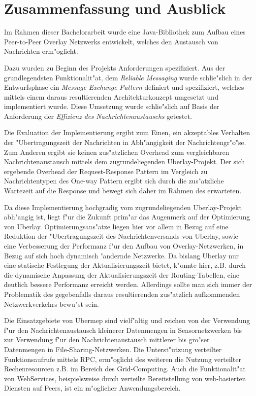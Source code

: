 \chapter{Zusammenfassung und Ausblick}
\label{cha:zusammenfassung}

Im Rahmen dieser Bachelorarbeit wurde eine Java-Bibliothek zum Aufbau eines Peer-to-Peer Overlay Netzwerks entwickelt, welches den Austausch von Nachrichten erm"oglicht.

Dazu wurden zu Beginn des Projekts Anforderungen spezifiziert. Aus der grundlegendsten Funktionalit"at, dem \emph{Reliable Messaging} wurde schlie"slich in der Entwurfsphase ein \emph{Message Exchange Pattern} definiert und spezifiziert, welches mittels einem daraus resultierenden Architekturkonzept umgesetzt und implementiert wurde. Diese Umsetzung wurde schlie"slich auf Basis der Anforderung der \emph{Effizienz des Nachrichtenaustauschs} getestet.

Die Evaluation der Implementierung ergibt zum Einen, ein akzeptables Verhalten der "Ubertragungszeit der Nachrichten in Abh"angigkeit der Nachrichtengr"o"se. Zum Anderen ergibt sie keinen zus"atzlichen Overhead zum vergleichbaren Nachrichtenaustausch mittels dem zugrundeliegenden Uberlay-Projekt. Der sich ergebende Overhead der Request-Response Pattern im Vergleich zu Nachrichtentypen des One-way Pattern ergibt sich durch die zus"atzliche Wartezeit auf die Response und bewegt sich daher im Rahmen des erwarteten. 

Da diese Implementierung hochgradig vom zugrundeliegenden Uberlay-Projekt abh"angig ist, liegt f"ur die Zukunft prim"ar das Augenmerk auf der Optimierung von Uberlay. Optimierungsans"atze liegen hier vor allem in Bezug auf eine Reduktion der "Ubertragungszeit des Nachrichtenversands von Uberlay, sowie eine Verbesserung der Performanz  f"ur den Aufbau von Overlay-Netzwerken, in Bezug auf sich hoch dynamisch "andernde Netzwerke. Da bislang Uberlay nur eine statische Festlegung der Aktualisierungszeit bietet, k"onnte hier, z.B. durch die dynamische Anpassung der Aktualisierungszeit der Routing-Tabellen, eine deutlich bessere Performanz erreicht werden. Allerdings sollte man sich immer der Problematik des gegebenfalls daraus resultierenden zus"atzlich aufkommenden Netzwerkverkehrs bewu"st sein.

Die Einsatzgebiete von Ubermep sind vielf"altig und reichen von der Verwendung f"ur den Nachrichtenaustausch kleinerer Datenmengen in Sensornetzwerken bis zur Verwendung f"ur den Nachrichtenaustausch mittlerer bis gro"ser Datenmengen in File-Sharing-Netzwerken. Die Unterst"utzung verteilter Funktionsaufrufe mittels RPC, erm"oglicht des weiteren die Nutzung verteilter Rechenresourcen z.B. im Bereich des Grid-Computing. Auch die Funktionalit"at von WebServices, beispielsweise durch verteilte Bereitstellung von web-basierten Diensten auf Peers, ist ein m"oglicher Anwendungsbereich.